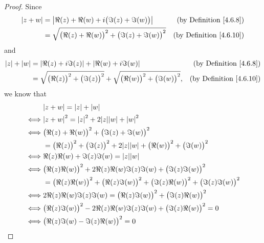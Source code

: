 \begin{proof}
    Since
    \begin{align*}
        \abs*{z + w} & = \abs*{\Re(z) + \Re(w) + i \big(\Im(z) + \Im(w)\big)}             & \text{(by Definition \ref{4.6.8})}  \\
                     & = \sqrt{\big(\Re(z) + \Re(w)\big)^2 + \big(\Im(z) + \Im(w)\big)^2} & \text{(by Definition \ref{4.6.10})}
    \end{align*}
    and
    \begin{align*}
        \abs*{z} + \abs*{w} & = \abs*{\Re(z) + i \Im(z)} + \abs*{\Re(w) + i \Im(w)}                                              & \text{(by Definition \ref{4.6.8})}  \\
                            & = \sqrt{\big(\Re(z)\big)^2 + \big(\Im(z)\big)^2} + \sqrt{\big(\Re(w)\big)^2 + \big(\Im(w)\big)^2}, & \text{(by Definition \ref{4.6.10})}
    \end{align*}
    we know that
    \begin{align*}
             & \abs*{z + w} = \abs*{z} + \abs*{w}                                                                              \\
        \iff & \abs*{z + w}^2 = \abs*{z}^2 + 2 \abs*{z} \abs*{w} + \abs*{w}^2                                                  \\
        \iff & \big(\Re(z) + \Re(w)\big)^2 + \big(\Im(z) + \Im(w)\big)^2                                                       \\
             & = \big(\Re(z)\big)^2 + \big(\Im(z)\big)^2 + 2 \abs*{z} \abs*{w} + \big(\Re(w)\big)^2 + \big(\Im(w)\big)^2       \\
        \iff & \Re(z) \Re(w) + \Im(z) \Im(w) = \abs*{z} \abs*{w}                                                               \\
        \iff & \big(\Re(z) \Re(w)\big)^2 + 2 \Re(z) \Re(w) \Im(z) \Im(w) + \big(\Im(z) \Im(w)\big)^2                           \\
             & = \big(\Re(z) \Re(w)\big)^2 + \big(\Re(z) \Im(w)\big)^2 + \big(\Im(z) \Re(w)\big)^2 + \big(\Im(z) \Im(w)\big)^2 \\
        \iff & 2 \Re(z) \Re(w) \Im(z) \Im(w) = \big(\Re(z) \Im(w)\big)^2 + \big(\Im(z) \Re(w)\big)^2                           \\
        \iff & \big(\Re(z) \Im(w)\big)^2 - 2 \Re(z) \Re(w) \Im(z) \Im(w) + \big(\Im(z) \Re(w)\big)^2 = 0                       \\
        \iff & \big(\Re(z) \Im(w) - \Im(z) \Re(w)\big)^2 = 0                                                                   \\

\end{align*}
\end{proof}
